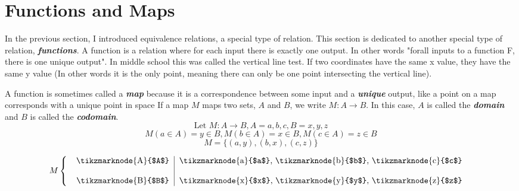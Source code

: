 \documentclass{report}
\begin{document}
\section{Functions and Maps}
In the previous section, I introduced equivalence relations, a special type of relation.
This section is dedicated to another special type of relation, \textbf{\textit{functions}}.
A function is a relation where for each input there is exactly one output.
In other words "forall inputs to a function F, there is one unique output".
In middle school this was called the vertical line test.
If two coordinates have the same x value, they have the same y value (In other words it is the only point, meaning there can only be one point intersecting the vertical line).

A function is sometimes called a \textbf{\textit{map}} because it is a correspondence between some input and a \textbf{\textit{unique}} output, like a point on a map corresponds with a unique point in space
If a map $M$ maps two sets, $A$ and $B$, we write $M: A \to B$.
In this case, $A$ is called the \textbf{\textit{domain}} and $B$ is called the \textbf{\textit{codomain}}.
$$\text{Let } M:A \to B, A = {a, b, c}, B = {x, y, z}$$
$$M(a \in A) = y \in B, M(b \in A) = x \in B, M(c \in A) = z \in B$$
$$M = \{(a, y), (b, x), (c, z)\}$$
\begin{center}
    \[
        M\left\{
        \begin{array}{l}
        \begin{tabular}{c| c}
            \tikzmarknode{A}{$A$} & \tikzmarknode{a}{$a$}, \tikzmarknode{b}{$b$}, \tikzmarknode{c}{$c$} \\
            \\
            \tikzmarknode{B}{$B$} & \tikzmarknode{x}{$x$}, \tikzmarknode{y}{$y$}, \tikzmarknode{z}{$z$} \\
        \end{tabular}
        \end{array}
        \right. 
    \]

\end{center}
\end{document}
